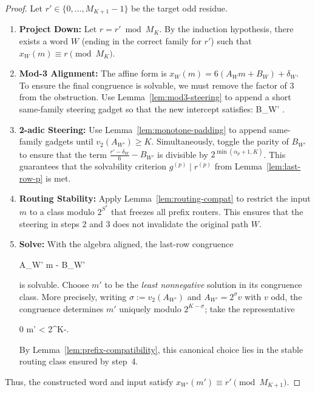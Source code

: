 \documentclass[11pt,letterpaper]{amsart}
\def\[{ }%
\def\]{ }%
\theoremstyle{definition}
\theoremstyle{plain}
\theoremstyle{plain}
\theoremstyle{remark}
\begin{document}
\begin{proof}
Let $r' \in \{0, \dots, M_{K+1}-1\}$ be the target odd residue.
\begin{enumerate}
    \item \textbf{Project Down:} Let $r = r' \bmod M_K$. By the induction hypothesis, there exists a word $W$ (ending in the correct family for $r'$) such that $x_W(m) \equiv r \pmod{M_K}$.

    \item \textbf{Mod-3 Alignment:} The affine form is $x_{W}(m) = 6(A_W m + B_W) + \delta_W$. To ensure the final congruence is solvable, we must remove the factor of 3 from the obstruction.
    Use Lemma~\ref{lem:mod3-steering} to append a short same-family steering gadget so that the new intercept satisfies:
    \[ B_{W'} \;\equiv\;  . \]

    \item \textbf{2-adic Steering:} Use Lemma~\ref{lem:monotone-padding} to append same-family gadgets until $v_2(A_{W'}) \ge K$. Simultaneously, toggle the parity of $B_{W'}$ to ensure that the term $\frac{r'-\delta_W}{6} - B_{W'}$ is divisible by $2^{\min(\alpha_p+1, K)}$.
    This guarantees that the solvability criterion $g^{(p)} \mid r^{(p)}$ from Lemma~\ref{lem:last-row-p} is met.

    \item \textbf{Routing Stability:} Apply Lemma~\ref{lem:routing-compat} to restrict the input $m$ to a class modulo $2^{S^\ast}$ that freezes all prefix routers. This ensures that the steering in steps 2 and 3 does not invalidate the original path $W$.

    \item \textbf{Solve:} With the algebra aligned, the last-row congruence
    \[
    A_{W'} m \;\equiv\;  - B_{W'} 
    \]
    is solvable. Choose $m'$ to be the \emph{least nonnegative} solution in its congruence class.
    More precisely, writing $\sigma:=v_2(A_{W'})$ and $A_{W'}=2^\sigma v$ with $v$ odd, the congruence
    determines $m'$ uniquely modulo $2^{K-\sigma}$; take the representative
    \[
    0 \le m' < 2^{K-\sigma}.
    \]
    By Lemma~\ref{lem:prefix-compatibility}, this canonical choice lies in the stable routing
    class ensured by step~4.

\end{enumerate}
Thus, the constructed word and input satisfy $x_{W'}(m') \equiv r' \pmod{M_{K+1}}$.
\end{proof}
\end{document}
